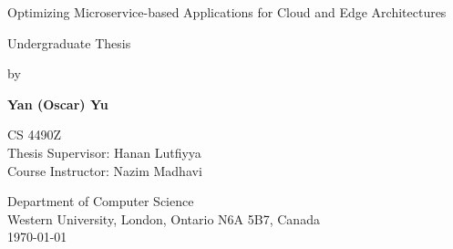\begin{titlepage}
    \begin{center}
        \vspace*{1cm}

        \Huge{Optimizing Microservice-based Applications for Cloud and Edge Architectures}
        \vspace{0.5cm}

        \Large
        Undergraduate Thesis
        \vspace{0.5cm}

        by
        \vspace{0.5cm}

        \textbf{Yan (Oscar) Yu}

        \vfill

        \large
        CS 4490Z\\
        Thesis Supervisor: Hanan Lutfiyya\\
        Course Instructor: Nazim Madhavi

        \vspace{0.5cm}
        Department of Computer Science\\
        Western University, London, Ontario N6A 5B7, Canada\\
        \today

    \end{center}
\end{titlepage}